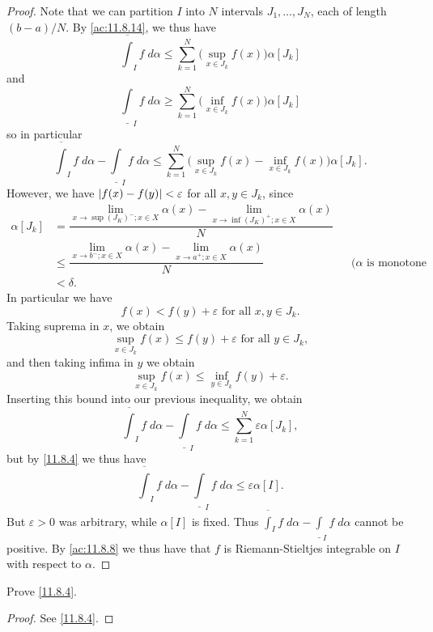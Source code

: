 \begin{proof}
  Note that we can partition \(I\) into \(N\) intervals \(J_1, \dots, J_N\), each of length \((b - a) / N\).
  By \cref{ac:11.8.14}, we thus have
  \[
    \overline{\int}_I f \; d \alpha \leq \sum_{k = 1}^N \big(\sup_{x \in J_k} f(x)\big) \alpha[J_k]
  \]
  and
  \[
    \underline{\int}_I f \; d \alpha \geq \sum_{k = 1}^N \big(\inf_{x \in J_k} f(x)\big) \alpha[J_k]
  \]
  so in particular
  \[
    \overline{\int}_I f \; d \alpha - \underline{\int}_I f \; d \alpha \leq \sum_{k = 1}^N \big(\sup_{x \in J_k} f(x) - \inf_{x \in J_k} f(x)\big) \alpha[J_k].
  \]
  However, we have \(\left\lvert f(x) - f(y)\right\rvert < \varepsilon\) for all \(x, y \in J_k\), since
  \begin{align*}
    \alpha[J_k] & = \dfrac{\lim_{x \to \sup(J_K)^- ; x \in X} \alpha(x) - \lim_{x \to \inf(J_K)^+ ; x \in X} \alpha(x)}{N}                                                 \\
                & \leq \dfrac{\lim_{x \to b^- ; x \in X} \alpha(x) - \lim_{x \to a^+ ; x \in X} \alpha(x)}{N}              &  & \text{(\(\alpha\) is monotone increasing)} \\
                & < \delta.
  \end{align*}
  In particular we have
  \[
    f(x) < f(y) + \varepsilon \text{ for all } x, y \in J_k.
  \]
  Taking suprema in \(x\), we obtain
  \[
    \sup_{x \in J_k} f(x) \leq f(y) + \varepsilon \text{ for all } y \in J_k,
  \]
  and then taking infima in \(y\) we obtain
  \[
    \sup_{x \in J_k} f(x) \leq \inf_{y \in J_k} f(y) + \varepsilon.
  \]
  Inserting this bound into our previous inequality, we obtain
  \[
    \overline{\int}_I f \; d \alpha - \underline{\int}_I f \; d \alpha \leq \sum_{k = 1}^N \varepsilon \alpha[J_k],
  \]
  but by \cref{11.8.4} we thus have
  \[
    \overline{\int}_I f \; d \alpha - \underline{\int}_I f \; d \alpha \leq \varepsilon \alpha[I].
  \]
  But \(\varepsilon > 0\) was arbitrary, while \(\alpha[I]\) is fixed.
  Thus \(\overline{\int}_I f \; d \alpha - \underline{\int}_I f \; d \alpha\) cannot be positive.
  By \cref{ac:11.8.8} we thus have that \(f\) is Riemann-Stieltjes integrable on \(I\) with respect to \(\alpha\).
\end{proof}

\exercisesection

\begin{ex}\label{ex:11.8.1}
  Prove \cref{11.8.4}.
\end{ex}

\begin{proof}
  See \cref{11.8.4}.
\end{proof}

